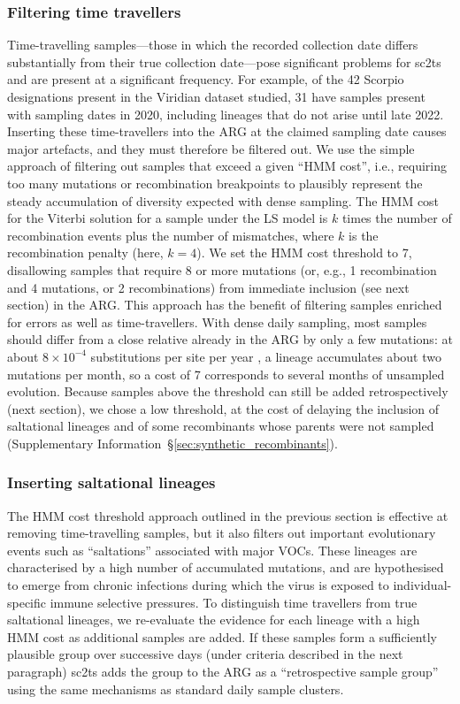 \documentclass[12pt]{article}
\newcommand{\supref}[1]{Supplementary Information~\S\ref{#1}}
\begin{document}
\subsubsection*{Filtering time travellers}
Time-travelling samples---those in which the recorded collection date differs
substantially from their true collection date---pose significant problems
for sc2ts and are present at a significant frequency. For example, of the
42 Scorpio~\cite{Colquhoun2023scorpio}
designations present in the Viridian dataset studied, 31 have
samples present with sampling dates in 2020, including lineages that do not
arise until late 2022. Inserting these time-travellers into the ARG
at the claimed sampling date causes major artefacts, and they must therefore be
filtered out. We use the simple approach of filtering out samples that
exceed a given ``HMM cost'', i.e., requiring too many mutations or
recombination breakpoints to plausibly represent the steady accumulation
of diversity expected with dense sampling.
The HMM cost for the Viterbi solution for a sample under the LS model
is $k$ times the number of recombination events plus the number of
mismatches, where $k$ is the recombination penalty (here, $k=4$).
We set the HMM cost threshold to 7,
disallowing samples that require 8 or more mutations (or, e.g., 1 recombination
and 4 mutations, or 2 recombinations) from immediate inclusion (see next
section) in the ARG. This approach has the benefit of filtering
samples enriched for errors as well as time-travellers.
With dense daily sampling, most samples should differ from a close relative
already in the ARG by only a few mutations:
at about $8\times10^{-4}$ substitutions per site per year \cite{Ghafari2022},
a lineage accumulates about two mutations per month,
so a cost of 7 corresponds to several months of unsampled evolution.
Because samples above the threshold can still be added retrospectively (next section),
we chose a low threshold, at the cost of delaying the inclusion of saltational lineages
and of some recombinants whose parents were not sampled
(\supref{sec:synthetic_recombinants}).

\subsubsection*{Inserting saltational lineages}
The HMM cost threshold approach outlined in the previous section is
effective at removing time-travelling samples, but it also filters out
important evolutionary events such as
``saltations'' associated with major VOCs.
These lineages are characterised by a high number of accumulated mutations,
and are hypothesised to emerge from chronic infections
during which the virus is exposed to individual-specific immune selective
pressures\cite{Otto2021origins,Markov2023}.
To distinguish time travellers from true saltational lineages,
we re-evaluate the evidence for each lineage with a high HMM cost
as additional samples are added.
If these samples form a sufficiently plausible group over successive days
(under criteria described in the next paragraph)
sc2ts adds the group to the ARG as a
``retrospective sample group'' using the same mechanisms
as standard daily sample clusters.
\end{document}

